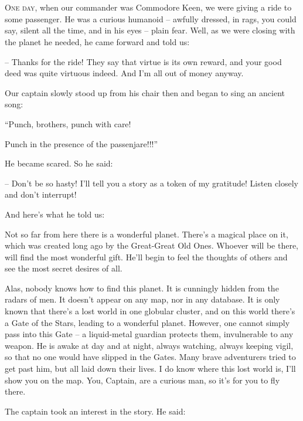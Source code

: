 \documentclass[ebook,twoside,final,openright]{memoir}
\begin{document}
\chapter{}
\par
\lettrine{O}{ne day,} when our commander was Commodore Keen, we were giving a ride to some passenger. He was a curious humanoid – awfully dressed, in rags, you could say, silent all the time, and in his eyes – plain fear. Well, as we were closing with the planet he needed, he came forward and told us: \par
\par
– Thanks for the ride! They say that virtue is its own reward, and your good deed was quite virtuous indeed. And I’m all out of money anyway.\par
Our captain slowly stood up from his chair then and began to sing an ancient song: \par
“Punch, brothers, punch with care! \par
 Punch in the presence of the passenjare!!!” \par
He became scared. So he said:\par
– Don’t be so hasty! I'll tell you a story as a token of my gratitude! Listen closely and don’t interrupt! \par
 And here’s what he told us:\par
\par
Not so far from here there is a wonderful planet. There’s a magical place on it, which was created long ago by the Great-Great Old Ones. Whoever will be there, will find the most wonderful gift. He’ll begin to feel the thoughts of others and see the most secret desires of all. \par
Alas, nobody knows how to find this planet. It is cunningly hidden from the radars of men. It doesn’t appear on any map, nor in any database. It is only known that there’s a lost world in one globular cluster, and on this world there’s a Gate of the Stars, leading to a wonderful planet. However, one cannot simply pass into this Gate – a liquid-metal guardian protects them, invulnerable to any weapon. He is awake at day and at night, always watching, always keeping vigil, so that no one would have slipped in the Gates. Many brave adventurers tried to get past him, but all laid down their lives. I do know where this lost world is, I'll show you on the map. You, Captain, are a curious man, so it’s for you to fly there.\par
\par
The captain took an interest in the story. He said:\par
\end{document}
